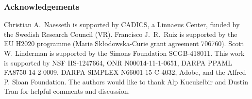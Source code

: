 \documentclass[twoside]{article}%
\begin{document}














\subsubsection*{Acknowledgements}
Christian A.\ Naesseth is supported by CADICS, a Linnaeus Center, funded by the Swedish Research Council (VR). Francisco J.\ R.\ Ruiz is supported by the EU H2020 programme (Marie Sk\l{}odowska-Curie grant agreement 706760). Scott W. Linderman is supported by the Simons Foundation SCGB-418011.
This work is supported by NSF IIS-1247664, ONR N00014-11-1-0651, DARPA
PPAML FA8750-14-2-0009, DARPA SIMPLEX N66001-15-C-4032, Adobe, and the
Alfred P. Sloan Foundation. The authors would like to thank Alp Kucukelbir and Dustin Tran for helpful comments and discussion.




\end{document}
